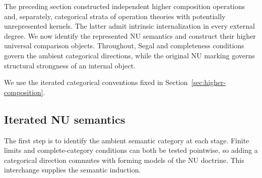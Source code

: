 \documentclass[oneside]{article}
\theoremstyle{plain}
\theoremstyle{definition}
\theoremstyle{remark}
\begin{document}
The preceding section constructed independent higher composition
operations and, separately, categorical strata of operation theories
with potentially unrepresented kernels. The latter admit intrinsic
internalization in every external degree. We now identify the represented
NU semantics and construct their higher universal comparison objects.
Throughout, Segal and completeness conditions govern the ambient
categorical directions, while the original NU marking governs structural
strongness of an internal object.

We use the iterated categorical conventions fixed in Section~\ref{sec:higher-composition}.

\subsection{Iterated NU semantics}
\label{subsec:stratified-semantics}

The first step is to identify the ambient semantic category at each
stage. Finite limits and complete-category conditions can both be tested
pointwise, so adding a categorical direction commutes with forming models
of the NU doctrine. This interchange supplies the semantic induction.
\end{document}
